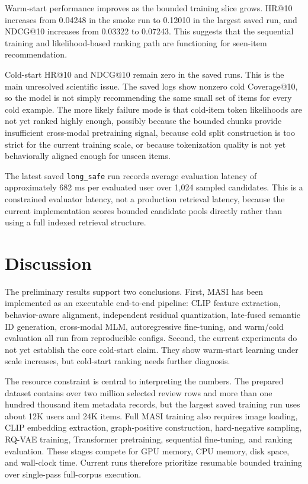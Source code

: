 \documentclass[conference]{IEEEtran}
\begin{document}
Warm-start performance improves as the bounded training slice grows. HR@10 increases from 0.04248 in the smoke run to 0.12010 in the largest saved run, and NDCG@10 increases from 0.03322 to 0.07243. This suggests that the sequential training and likelihood-based ranking path are functioning for seen-item recommendation.

Cold-start HR@10 and NDCG@10 remain zero in the saved runs. This is the main unresolved scientific issue. The saved logs show nonzero cold Coverage@10, so the model is not simply recommending the same small set of items for every cold example. The more likely failure mode is that cold-item token likelihoods are not yet ranked highly enough, possibly because the bounded chunks provide insufficient cross-modal pretraining signal, because cold split construction is too strict for the current training scale, or because tokenization quality is not yet behaviorally aligned enough for unseen items.

The latest saved \texttt{long\_safe} run records average evaluation latency of approximately 682 ms per evaluated user over 1,024 sampled candidates. This is a constrained evaluator latency, not a production retrieval latency, because the current implementation scores bounded candidate pools directly rather than using a full indexed retrieval structure.

\section{Discussion}
The preliminary results support two conclusions. First, MASI has been implemented as an executable end-to-end pipeline: CLIP feature extraction, behavior-aware alignment, independent residual quantization, late-fused semantic ID generation, cross-modal MLM, autoregressive fine-tuning, and warm/cold evaluation all run from reproducible configs. Second, the current experiments do not yet establish the core cold-start claim. They show warm-start learning under scale increases, but cold-start ranking needs further diagnosis.

The resource constraint is central to interpreting the numbers. The prepared dataset contains over two million selected review rows and more than one hundred thousand item metadata records, but the largest saved training run uses about 12K users and 24K items. Full MASI training also requires image loading, CLIP embedding extraction, graph-positive construction, hard-negative sampling, RQ-VAE training, Transformer pretraining, sequential fine-tuning, and ranking evaluation. These stages compete for GPU memory, CPU memory, disk space, and wall-clock time. Current runs therefore prioritize resumable bounded training over single-pass full-corpus execution.
\end{document}
